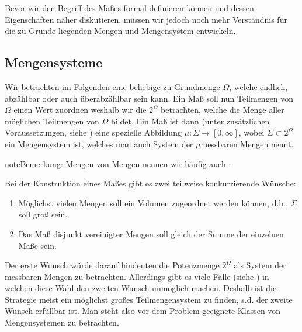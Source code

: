 \documentclass[letterpaper,10pt,german]{jupyterBook}
\begin{document}
\sphinxAtStartPar
Bevor wir den Begriff des Maßes formal definieren können und dessen Eigenschaften näher diskutieren, müssen wir jedoch noch mehr Verständnis für die zu Grunde liegenden Mengen und Mengensystem entwickeln.


\subsection{Mengensysteme}
\label{\detokenize{masstheorie/masstheorie:mengensysteme}}\label{\detokenize{masstheorie/masstheorie:s-sigmaalg}}
\sphinxAtStartPar
Wir betrachten im Folgenden eine beliebige zu Grundmenge \(\Omega\), welche endlich, abzählbar oder auch überabzählbar sein kann. Ein Maß soll nun Teilmengen von \(\Omega\) einen Wert zuordnen weshalb wir die  \(2^\Omega\) betrachten, welche die Menge aller möglichen Teilmengen von \(\Omega\) bildet. Ein Maß ist dann (unter zusätzlichen Voraussetzungen, siehe {\hyperref[\detokenize{masstheorie/masstheorie:def:mass}]{}}) eine spezielle Abbildung \(\mu:\Sigma\to[0,\infty]\), wobei \(\Sigma\subset 2^\Omega\) ein Mengensystem ist, welches man auch System der \(\mu\)\sphinxhyphen{}messbaren Mengen nennt.

\begin{sphinxadmonition}{note}{Bemerkung:}
\sphinxAtStartPar
Mengen von Mengen nennen wir häufig auch .
\end{sphinxadmonition}

\sphinxAtStartPar
Bei der Konstruktion eines Maßes gibt es zwei teilweise konkurrierende Wünsche:
\begin{enumerate}
%
\item {} 
\sphinxAtStartPar
Möglichst vielen Mengen soll ein Volumen zugeordnet werden können, d.h., \(\Sigma\) soll groß sein.

\item {} 
\sphinxAtStartPar
Das Maß disjunkt vereinigter Mengen soll gleich der Summe der einzelnen Maße sein.

\end{enumerate}

\sphinxAtStartPar
Der erste Wunsch würde darauf hindeuten die Potenzmenge \(2^\Omega\) als System der messbaren Mengen zu betrachten. Allerdings gibt es viele Fälle (siehe {\hyperref[\detokenize{masstheorie/masstheorie:s-vitali}]{}}) in welchen diese Wahl den zweiten Wunsch unmöglich machen. Deshalb ist die Strategie meist ein möglichst großes Teilmengensystem zu finden, s.d. der zweite Wunsch erfüllbar ist. Man steht also vor dem Problem geeignete Klassen von Mengensystemen zu betrachten.
\end{document}
